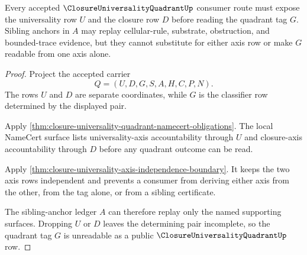 \begin{theorem}
\label{thm:closure-universality-quadrant-axis-accountability}
Every accepted $\ClosureUniversalityQuadrantUp$ consumer route must expose the universality row $U$ and the closure row $D$ before reading the quadrant tag $G$. Sibling anchors in $A$ may replay cellular-rule, substrate, obstruction, and bounded-trace evidence, but they cannot substitute for either axis row or make $G$ readable from one axis alone.
\end{theorem}
\begin{proof}
Project the accepted carrier
$$
Q=(U,D,G,S,A,H,C,P,N).
$$
The rows $U$ and $D$ are separate coordinates, while $G$ is the classifier row determined by the displayed pair.

Apply \autoref{thm:closure-universality-quadrant-namecert-obligations}. The local NameCert surface lists universality-axis accountability through $U$ and closure-axis accountability through $D$ before any quadrant outcome can be read.

Apply \autoref{thm:closure-universality-axis-independence-boundary}. It keeps the two axis rows independent and prevents a consumer from deriving either axis from the other, from the tag alone, or from a sibling certificate.

The sibling-anchor ledger $A$ can therefore replay only the named supporting surfaces. Dropping $U$ or $D$ leaves the determining pair incomplete, so the quadrant tag $G$ is unreadable as a public $\ClosureUniversalityQuadrantUp$ row.
\end{proof}

